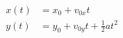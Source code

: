 

\vspace*{\fill}
\centering

\begin{align*}
x(t) &= x_0 + v_{0x}t \\
y(t) &= y_0 + v_{0y}t + \frac{1}{2}at^2
\end{align*}

\centering
\vspace*{\fill}

